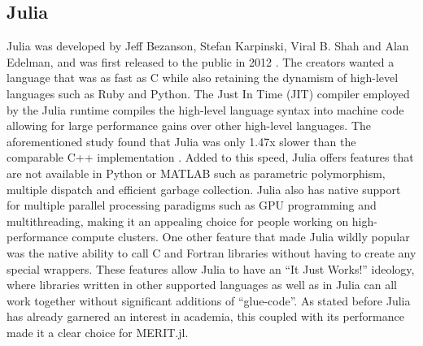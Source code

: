 \subsection{Julia}
Julia was developed by Jeff Bezanson, Stefan Karpinski, Viral B. Shah and Alan Edelman, and was first released to the
public in 2012 \cite{bezansonWhyWeCreated12}. The creators wanted a language that was as fast as C while also retaining
the dynamism of high-level languages such as Ruby and Python. The Just In Time (JIT) compiler employed by the Julia
runtime compiles the high-level language syntax into machine code allowing for large performance gains over other
high-level languages. The aforementioned study found that Julia was only 1.47x slower than the comparable C++
implementation \cite{aruobaComparisonProgrammingLanguages2018}. Added to this speed, Julia offers features that are not
available in Python or MATLAB such as parametric polymorphism, multiple dispatch and efficient garbage collection. Julia
also has native support for multiple parallel processing paradigms such as GPU programming and multithreading, making it
an appealing choice for people working on high-performance compute clusters. One other feature that made Julia wildly
popular was the native ability to call C and Fortran libraries without having to create any special wrappers. These
features allow Julia to have an ``It Just Works!'' ideology, where libraries written in other supported languages as
well as in Julia can all work together without significant additions of ``glue-code''. As stated before Julia has
already garnered an interest in academia, this coupled with its performance made it a clear choice for MERIT.jl. 